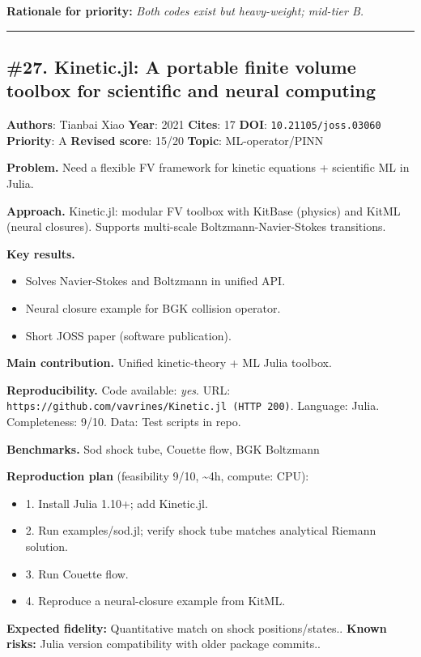 \documentclass[10pt,letterpaper]{article}
\begin{document}
\textbf{Rationale for priority:} \emph{Both codes exist but heavy-weight; mid-tier B.}

\medskip\hrule\medskip

\subsection*{\#27. Kinetic.jl: A portable finite volume toolbox for scientific and neural computing}
\textbf{Authors}: Tianbai Xiao \textbullet{} \textbf{Year}: 2021 \textbullet{} \textbf{Cites}: 17 \textbullet{} \textbf{DOI}: \texttt{10.21105/joss.03060} \\
\textbf{Priority}: A \textbullet{} \textbf{Revised score}: 15/20 \textbullet{} \textbf{Topic}: ML-operator/PINN

\textbf{Problem.} Need a flexible FV framework for kinetic equations + scientific ML in Julia.

\textbf{Approach.} Kinetic.jl: modular FV toolbox with KitBase (physics) and KitML (neural closures). Supports multi-scale Boltzmann-Navier-Stokes transitions.

\textbf{Key results.}
\begin{itemize}
\item Solves Navier-Stokes and Boltzmann in unified API.
\item Neural closure example for BGK collision operator.
\item Short JOSS paper (software publication).
\end{itemize}

\textbf{Main contribution.} Unified kinetic-theory + ML Julia toolbox.

\textbf{Reproducibility.} Code available: \emph{yes}. URL: \texttt{https://github.com/vavrines/Kinetic.jl (HTTP 200)}. Language: Julia. Completeness: 9/10. Data: Test scripts in repo.

\textbf{Benchmarks.} Sod shock tube, Couette flow, BGK Boltzmann

\textbf{Reproduction plan} (feasibility 9/10, \textasciitilde4h, compute: CPU):
\begin{itemize}
\item 1. Install Julia 1.10+; add Kinetic.jl.
\item 2. Run examples/sod.jl; verify shock tube matches analytical Riemann solution.
\item 3. Run Couette flow.
\item 4. Reproduce a neural-closure example from KitML.
\end{itemize}
\textbf{Expected fidelity:} Quantitative match on shock positions/states.. \textbf{Known risks:} Julia version compatibility with older package commits..
\end{document}
